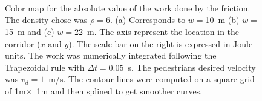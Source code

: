 \begin{figure}[!htbp]
    \\ 
    \\
    \
\caption[width=0.47\columnwidth] {Color map for the absolute value of the work done by the friction. The density chose was $\rho=6$. (a) Corresponds to $w=$10~m (b) $w=$15~m and (c) $w=$22~m. The axis represent the location in the corridor ($x$ and $y$). The scale bar on the right is expressed in Joule units. The work was numerically integrated following the Trapezoidal rule with $\Delta t =0.05$~s. The pedestrians desired velocity was $v_d = 1$~m/s. The contour lines were computed on a square grid of 1m$\times$~1m and then splined to get smoother curves.} 
\label{abswg}
\end{figure}

